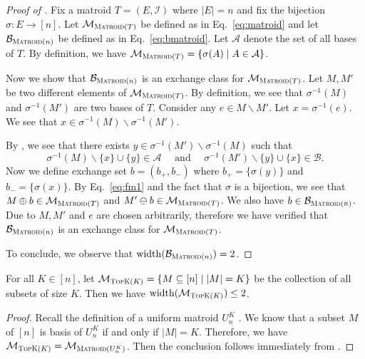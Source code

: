 \documentclass{article}
\newcommand{\M}{\mathcal M}
\newcommand{\B}{\mathcal B}
\newcommand{\del}{\backslash}
\DeclareMathOperator{\rank}{width}
\newcommand{\MultiIdent}{\textsc{TopK}\xspace}
\newcommand{\Matroid}{\textsc{Matroid}\xspace}
\begin{document}
\begin{proof}[Proof of ]
Fix a matroid $T=(E,\mathcal I)$ where $|E|=n$ and fix the bijection $\sigma\colon E\rightarrow [n]$.
Let $\M_{\Matroid(T)}$ be defined as in Eq.~\eqref{eq:matroid} and let $\B_{\Matroid(n)}$ be defined as in Eq.~\eqref{eq:bmatroid}.
Let $\mathcal A$ denote the set of all bases of $T$. 
By definition, we have $\M_{\Matroid(T)} = \{\sigma(A) \mid A\in\mathcal A\}$.

Now we show that $\B_{\Matroid(n)}$ is an exchange class for $\M_{\Matroid(T)}$.
Let $M,M'$ be two different elements of $\M_{\Matroid(T)}$. 
By definition, we see that $\sigma^{-1}(M)$ and $\sigma^{-1}(M')$ are two bases of $T$.
Consider any $e\in M\del M'$. Let $x = \sigma^{-1}(e)$. 
We see that $x\in \sigma^{-1}(M) \del \sigma^{-1}(M')$. 

By , we see that there exists $y \in \sigma^{-1}(M') \del \sigma^{-1}(M)$ 
such that 
\begin{equation}
\label{eq:fm1}
\sigma^{-1}(M) \del \{x\} \cup \{y\} \in \mathcal A\quad\text{ and }\quad\sigma^{-1}(M') \del \{y\} \cup \{x\} \in \mathcal B.
\end{equation}
Now we define exchange set $b=(b_+,b_-)$ where $b_+ = \{\sigma(y)\}$ and $b_-=\{\sigma(x)\}$. 
By Eq.~\eqref{eq:fm1} and the fact that $\sigma$ is a bijection, we see that $M\oplus b \in \M_{\Matroid(T)}$ and $M'\ominus b \in \M_{\Matroid(T)}$. We also have $b\in \B_{\Matroid(n)}$.
Due to $M,M'$ and $e$ are chosen arbitrarily, therefore we have verified that $\B_{\Matroid(n)}$ is an exchange class for $\M_{\Matroid(T)}$.

To conclude, we observe that $\rank(\B_{\Matroid(n)}) = 2$.
\end{proof}

\begin{fact}[\MultiIdent]
\label{fact:topk}
For all $K \in [n]$, let $\M_{\MultiIdent(K)} = \{M\subseteq [n] \mid |M| = K\}$ be the collection of all subsets of size $K$.
Then we have $\rank(\M_{\MultiIdent(K)}) \le 2$.
\end{fact}
\begin{proof}
Recall the definition of a uniform matroid $U_n^K$ \citep{oxley2006matroid}. 
We know that a subset $M$ of $[n]$ is basis of $U_n^K$ if and only if $|M|=K$.
Therefore, we have $\M_{\MultiIdent(K)}=\M_{\Matroid(U_n^K)}$. 
Then the conclusion follows immediately from .
\end{proof}
\end{document}

